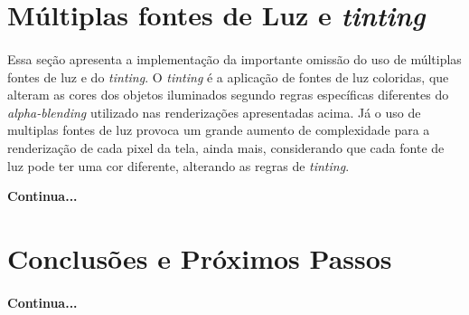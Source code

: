 \documentclass{article}
\begin{document}
	\section{Múltiplas fontes de Luz e \textit{tinting}}
	
	\paragraph{}
	Essa seção apresenta a implementação da importante omissão do uso de múltiplas fontes de luz e do \textit{tinting}. O \textit{tinting} é a aplicação de fontes de luz coloridas, que alteram as cores dos objetos iluminados segundo regras específicas diferentes do \textit{alpha-blending} utilizado nas renderizações apresentadas acima. Já o uso de multiplas fontes de luz provoca um grande aumento de complexidade para a renderização de cada pixel da tela, ainda mais, considerando que cada fonte de luz pode ter uma cor diferente, alterando as regras de \textit{tinting}.
	
	\textbf{Continua...}
	
	\section{Conclusões e Próximos Passos}
	
	\paragraph{}
	\textbf{Continua...}

	
\end{document}
